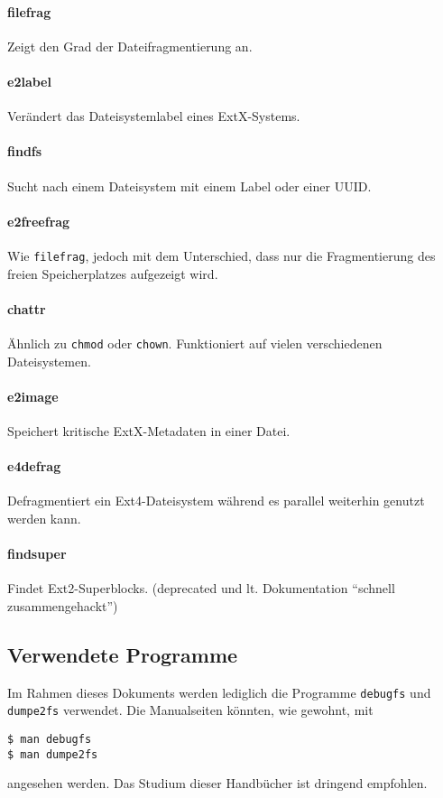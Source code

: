 \documentclass[11pt,a4paper]{article}
\def\inlinebash{\lstinline[style=bash]}
\begin{document}
\paragraph{filefrag}
	Zeigt den Grad der Dateifragmentierung an.

\paragraph{e2label}
	Verändert das Dateisystemlabel eines ExtX-Systems.

\paragraph{findfs}
	Sucht nach einem Dateisystem mit einem Label oder einer UUID.

\paragraph{e2freefrag}
	Wie \inlinebash$filefrag$, jedoch mit dem Unterschied, dass nur die Fragmentierung
	des freien Speicherplatzes aufgezeigt wird.

\paragraph{chattr}
	Ähnlich zu \inlinebash$chmod$ oder \inlinebash$chown$. Funktioniert auf vielen verschiedenen Dateisystemen. 

\paragraph{e2image}
	Speichert kritische ExtX-Metadaten in einer Datei. 

\paragraph{e4defrag}
	Defragmentiert ein Ext4-Dateisystem während es parallel
	weiterhin genutzt werden kann.

\paragraph{findsuper}
	Findet Ext2-Superblocks. (deprecated und lt. Dokumentation ``schnell zusammengehackt'')

\subsection{Verwendete Programme}
Im Rahmen dieses Dokuments werden lediglich die Programme \inlinebash$debugfs$
und \inlinebash$dumpe2fs$ verwendet. Die Manualseiten könnten, wie gewohnt, mit
\begin{lstlisting}[style=bash]
$ man debugfs
$ man dumpe2fs
\end{lstlisting}
angesehen werden. Das Studium dieser Handbücher ist dringend empfohlen.
\end{document}
